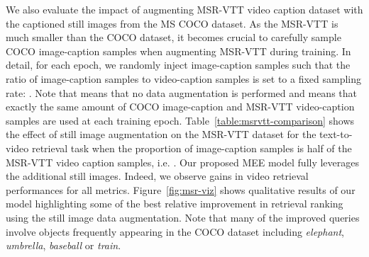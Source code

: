 \documentclass[runningheads]{llncs}
\begin{document}
We also evaluate the impact of augmenting MSR-VTT video caption dataset with the captioned still images from the MS COCO dataset. As the MSR-VTT is much smaller than the COCO dataset, it becomes crucial to carefully sample COCO image-caption samples when augmenting MSR-VTT during training. In detail, for each epoch,  we randomly inject image-caption samples such that the ratio of image-caption samples to video-caption samples is set to a fixed sampling rate: . Note that  means that no data augmentation is performed and  means that exactly the same amount of COCO image-caption and MSR-VTT video-caption samples are used at each training epoch. 
Table~\ref{table:msrvtt-comparison} shows the effect of still image augmentation on the MSR-VTT dataset for the text-to-video retrieval task when the proportion of image-caption samples is half of the MSR-VTT video caption samples, i.e. . 
Our proposed MEE model fully leverages the additional still images. Indeed, we observe gains in video retrieval performances for all metrics. Figure~\ref{fig:msr-viz} shows qualitative results of our model highlighting some of the best relative improvement in retrieval ranking using the still image data augmentation. Note that many of the improved queries involve objects  frequently appearing in the COCO dataset including \textit{elephant}, \textit{umbrella}, \textit{baseball} or  \textit{train}.





\begin{table}[t]
  \setlength{\tabcolsep}{3pt}
    \centering
        \caption{\small Text-to-video and Video-to-Text retrieval results from the LSMDC test sets. MR stands for Median Rank, MC for Multiple Choice.}
      \label{table:mpii-comparison}
\end{table}
\end{document}
